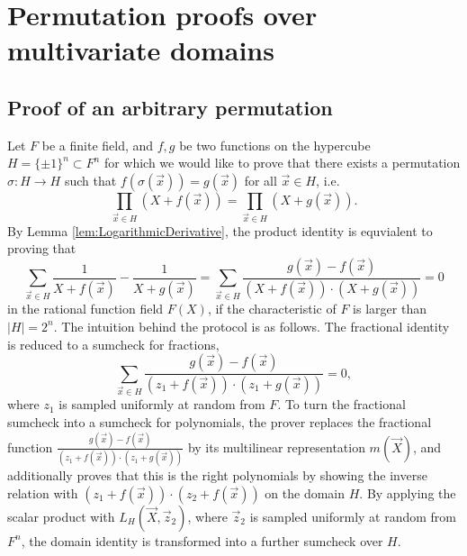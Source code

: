 \documentclass[11pt]{article}
\theoremstyle{definition}
\theoremstyle{remark}
\begin{document}
\section{Permutation proofs over multivariate domains}


\subsection{Proof of an arbitrary permutation}
Let $F$ be a finite field, and $f, g$ be two functions on the hypercube $H=\{\pm 1\}^n\subset F^n$ for which we would like to prove that there exists a permutation $\sigma: H\rightarrow H$ such that $f(\sigma(\vec x)) = g(\vec x)$ for all $\vec x\in H$, i.e.
\[
\prod_{\vec x \in H} (X + f(\vec x)) = \prod_{\vec x \in H} (X + g(\vec x)). 
\]
By Lemma \ref{lem:LogarithmicDerivative}, the product identity is equvialent to proving that
\begin{equation}
\label{e:FractionalIdentityPermutation}
\sum_{\vec x\in H} \frac{1}{X + f(\vec x)} - \frac{1}{X + g(\vec x)} = \sum_{\vec x\in H} \frac{g(\vec x) - f(\vec x)}{(X + f(\vec x))\cdot (X + g(\vec x))} = 0
\end{equation}
in the rational function field $F(X)$, if the characteristic of $F$ is larger than $|H|=2^n$.
The intuition behind the protocol is as follows.
The fractional identity is reduced to a sumcheck for fractions, 
\begin{equation*}
\label{e:sumcheckFractions}
\sum_{\vec x\in H} \frac{g(\vec x) - f(\vec x)}{(z_1 + f(\vec x))\cdot (z_1 + g(\vec x))} =0,
\end{equation*}
where $z_1$ is sampled uniformly at random from $F$. 
To turn the fractional sumcheck into a sumcheck for polynomials, the prover replaces 
the fractional function $\frac{g(\vec x) - f(\vec x)}{(z_1 + f(\vec x))\cdot (z_1 + g(\vec x))}$ by its multilinear representation $m(\vec X)$, and additionally proves that this is the right polynomials by showing the inverse relation with $(z_1 + f(\vec x))\cdot (z_2 + f(\vec x))$ on the domain $H$.
By applying the scalar product with $L_H(\vec X, \vec z_2)$, where $\vec z_2$ is sampled uniformly at random from $F^n$, the domain identity is transformed into a further sumcheck over $H$.
\end{document}
